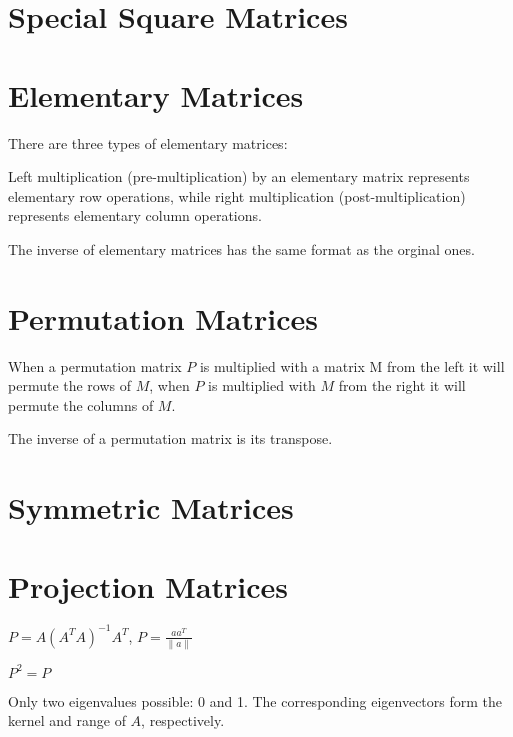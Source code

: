 \section{Special Square Matrices}
\section{Elementary Matrices}
There are three types of elementary matrices: {\color{red}{Row Switching, Row Multiplication, and Row Addition.}}

\begin{rmk}
	Left multiplication (pre-multiplication) by an elementary matrix represents elementary row operations, while right multiplication (post-multiplication) represents elementary column operations.
\end{rmk}

\begin{rmk}
	The inverse of elementary matrices has the same format as the orginal ones.
\end{rmk}

\section{Permutation  Matrices}
\begin{rmk}
	When a permutation matrix $P$ is multiplied with a matrix M from the left it will permute the rows of $M$, when $P$ is multiplied with $M$ from the right it will permute the columns of $M$.
\end{rmk}

\begin{rmk}
	The inverse of a permutation matrix is its transpose.
\end{rmk}

\section{Symmetric Matrices}

\section{Projection Matrices}
\begin{rmk}
	$P = A(A^TA)^{-1}A^T$, $P = \frac{aa^T}{\|a\|}$
\end{rmk}

\begin{rmk}
	$P^2=P$
\end{rmk}

\begin{rmk}
	Only two eigenvalues possible: 0 and 1. The corresponding eigenvectors form the kernel and range of $A$, respectively.
\end{rmk}

